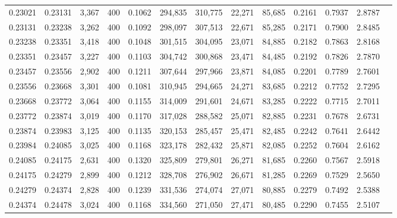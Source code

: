 \begin{tabular}{rrrrrrrrrrrrr}
0.23021 & 0.23131 &  3,367 & 400 &                                     0.1062 & 294,835 & 310,775 &  22,271 &  85,685 & 0.2161 & 0.7937 & 2.8787 \\
0.23131 & 0.23238 &  3,262 & 400 &                                     0.1092 & 298,097 & 307,513 &  22,671 &  85,285 & 0.2171 & 0.7900 & 2.8485 \\
0.23238 & 0.23351 &  3,418 & 400 &                                     0.1048 & 301,515 & 304,095 &  23,071 &  84,885 & 0.2182 & 0.7863 & 2.8168 \\
0.23351 & 0.23457 &  3,227 & 400 &                                     0.1103 & 304,742 & 300,868 &  23,471 &  84,485 & 0.2192 & 0.7826 & 2.7870 \\
0.23457 & 0.23556 &  2,902 & 400 &                                     0.1211 & 307,644 & 297,966 &  23,871 &  84,085 & 0.2201 & 0.7789 & 2.7601 \\
0.23556 & 0.23668 &  3,301 & 400 &                                     0.1081 & 310,945 & 294,665 &  24,271 &  83,685 & 0.2212 & 0.7752 & 2.7295 \\
0.23668 & 0.23772 &  3,064 & 400 &                                     0.1155 & 314,009 & 291,601 &  24,671 &  83,285 & 0.2222 & 0.7715 & 2.7011 \\
0.23772 & 0.23874 &  3,019 & 400 &                                     0.1170 & 317,028 & 288,582 &  25,071 &  82,885 & 0.2231 & 0.7678 & 2.6731 \\
0.23874 & 0.23983 &  3,125 & 400 &                                     0.1135 & 320,153 & 285,457 &  25,471 &  82,485 & 0.2242 & 0.7641 & 2.6442 \\
0.23984 & 0.24085 &  3,025 & 400 &                                     0.1168 & 323,178 & 282,432 &  25,871 &  82,085 & 0.2252 & 0.7604 & 2.6162 \\
0.24085 & 0.24175 &  2,631 & 400 &                                     0.1320 & 325,809 & 279,801 &  26,271 &  81,685 & 0.2260 & 0.7567 & 2.5918 \\
0.24175 & 0.24279 &  2,899 & 400 &                                     0.1212 & 328,708 & 276,902 &  26,671 &  81,285 & 0.2269 & 0.7529 & 2.5650 \\
0.24279 & 0.24374 &  2,828 & 400 &                                     0.1239 & 331,536 & 274,074 &  27,071 &  80,885 & 0.2279 & 0.7492 & 2.5388 \\
0.24374 & 0.24478 &  3,024 & 400 &                                     0.1168 & 334,560 & 271,050 &  27,471 &  80,485 & 0.2290 & 0.7455 & 2.5107 \\

\end{tabular}
